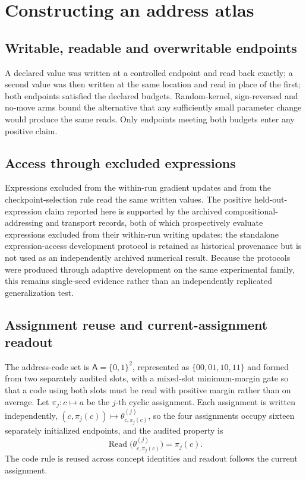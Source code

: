 \documentclass[11pt]{article}
\begin{document}
\section{Constructing an address atlas}

\subsection{Writable, readable and overwritable endpoints}

A declared value was written at a controlled endpoint and read back exactly; a second value was then written at
the same location and read in place of the first; both endpoints satisfied the declared budgets. Random-kernel,
sign-reversed and no-move arms bound the alternative that any sufficiently small parameter change would produce
the same reads. Only endpoints meeting both budgets enter any positive claim.

\subsection{Access through excluded expressions}

Expressions excluded from the within-run gradient updates and from the checkpoint-selection rule read the same
written values. The positive held-out-expression claim reported here is supported by the archived
compositional-addressing and transport records, both of which prospectively evaluate expressions excluded from
their within-run writing updates; the standalone expression-access development protocol is retained as
historical provenance but is not used as an independently archived numerical result. Because the protocols were
produced through adaptive development on the same experimental family, this remains single-seed evidence rather
than an independently replicated generalization test.

\subsection{Assignment reuse and current-assignment readout}

The address-code set is $\mathsf{A}=\{0,1\}^2$, represented as $\{00,01,10,11\}$ and formed from two
separately audited slots, with a mixed-slot
minimum-margin gate so that a code using both slots must be read with positive margin rather than on average.
Let $\pi_j:c\mapsto a$ be the $j$-th cyclic assignment. Each assignment is written independently,
$(c,\pi_j(c))\mapsto\theta^{(j)}_{c,\pi_j(c)}$, so the four assignments occupy sixteen separately initialized
endpoints, and the audited property is
\begin{equation}
\operatorname{Read}\bigl(\theta^{(j)}_{c,\pi_j(c)}\bigr)=\pi_j(c) .
\end{equation}
The code rule is reused across concept identities and readout follows the current assignment.
\end{document}
